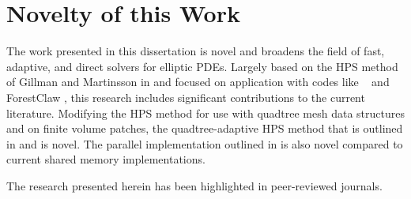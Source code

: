 \section{Novelty of this Work}

The work presented in this dissertation is novel and broadens the field of fast, adaptive, and direct solvers for elliptic PDEs. Largely based on the HPS method of Gillman and Martinsson in \citep{gillman2014direct,martinsson2019fast} and focused on application with codes like \pforest\ \citep{burstedde2011p4est,burstedde2020parallel} and ForestClaw \citep{calhoun2017forestclaw}, this research includes significant contributions to the current literature. Modifying the HPS method for use with quadtree mesh data structures and on finite volume patches, the quadtree-adaptive HPS method that is outlined in  and  is novel. The parallel implementation outlined in  is also novel compared to current shared memory implementations.

The research presented herein has been highlighted in peer-reviewed journals. 